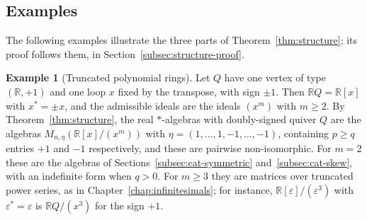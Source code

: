 \documentclass[12pt, a4paper]{report}
\theoremstyle{plain}
\theoremstyle{definition}
\newtheorem{example}[theorem]{Example}
\theoremstyle{remark}
\theoremstyle{plain}
\newcommand{\RR}{\mathbb{R}}
\begin{document}
\subsection{Examples}
\label{subsec:structure-examples}
The following examples illustrate the three parts of Theorem~\ref{thm:structure}; its proof follows them, in Section~\ref{subsec:structure-proof}.

\begin{example}[Truncated polynomial rings]\label{ex:structure-loop}
Let $Q$ have one vertex of type $(\RR,+1)$ and one loop $x$ fixed by the transpose, with sign $\pm1$. Then $\RR Q=\RR[x]$ with $x^*=\pm x$, and the admissible ideals are the ideals $(x^m)$ with $m\geq2$. By Theorem~\ref{thm:structure}, the real $*$-algebras with doubly-signed quiver $Q$ are the algebras $M_{n,\eta}(\RR[x]/(x^m))$ with $\eta=(1,\dots,1,-1,\dots,-1)$, containing $p\geq q$ entries $+1$ and $-1$ respectively, and these are pairwise non-isomorphic. For $m=2$ these are the algebras of Sections~\ref{subsec:cat-symmetric} and~\ref{subsec:cat-skew}, with an indefinite form when $q>0$. For $m\geq3$ they are matrices over truncated power series, as in Chapter~\ref{chap:infinitesimals}; for instance, $\RR[\varepsilon]/(\varepsilon^3)$ with $\varepsilon^*=\varepsilon$ is $\RR Q/(x^3)$ for the sign $+1$.
\end{example}
\end{document}
